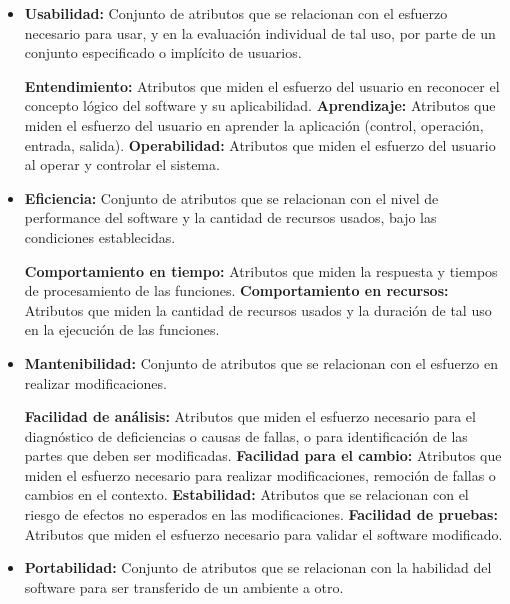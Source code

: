\begin{center}
\begin{itemize}
		\item \textbf{Usabilidad:} Conjunto de atributos que se
		      relacionan con el esfuerzo necesario para usar, y
		      en la evaluación individual de tal uso, por parte
		      de un conjunto especificado o implícito de
		      usuarios.

		      \subitem \textbf{Entendimiento: } Atributos que miden el esfuerzo del
		      usuario en reconocer el concepto lógico del
		      software y su aplicabilidad.
		      \subitem \textbf{ Aprendizaje: } Atributos que miden el esfuerzo del
		      usuario en aprender la aplicación (control,
		      operación, entrada, salida).
		      \subitem \textbf{Operabilidad: } Atributos que miden el esfuerzo del
		      usuario al operar y controlar el sistema.

		\item \textbf{Eficiencia:} Conjunto de atributos que se
		      relacionan con el nivel de performance del
		      software y la cantidad de recursos usados, bajo
		      las condiciones establecidas.

		      \subitem \textbf{Comportamiento en tiempo: } Atributos que miden la
		      respuesta y tiempos de procesamiento de las
		      funciones.
		      \subitem \textbf{Comportamiento en recursos: } Atributos que miden
		      la cantidad de recursos usados y la duración de tal
		      uso en la ejecución de las funciones.

		\item \textbf{Mantenibilidad:} Conjunto de atributos que se
		      relacionan con el esfuerzo en realizar modificaciones.

		      \subitem \textbf{Facilidad de análisis: } Atributos que miden el esfuerzo
		      necesario para el diagnóstico de deficiencias o causas
		      de fallas, o para identificación de las partes que deben
		      ser modificadas.
		      \subitem \textbf{Facilidad para el cambio: } Atributos que miden el
		      esfuerzo necesario para realizar modificaciones,
		      remoción de fallas o cambios en el contexto.
		      \subitem \textbf{Estabilidad: }Atributos que se relacionan con el riesgo de
		      efectos no esperados en las modificaciones.
		      \subitem \textbf{Facilidad de pruebas: } Atributos que miden el esfuerzo
		      necesario para validar el software modificado.

		\item \textbf{Portabilidad:} Conjunto de atributos que se relacionan
		      con la habilidad del software para ser transferido de un
		      ambiente a otro.


\end{itemize}
\end{center}
